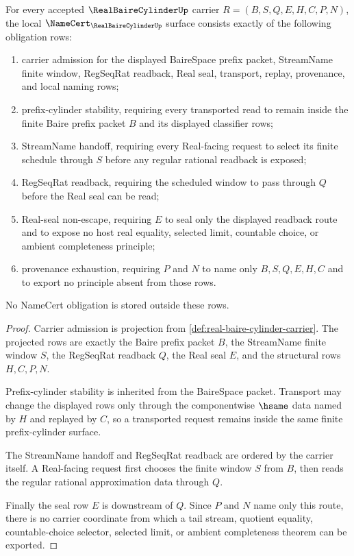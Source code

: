 \begin{theorem}\label{thm:real-baire-cylinder-namecert-obligations}
For every accepted $\RealBaireCylinderUp$ carrier $R=(B,S,Q,E,H,C,P,N)$, the local $\NameCert_{\RealBaireCylinderUp}$ surface consists exactly of the following obligation rows:
\begin{enumerate}
\item carrier admission for the displayed BaireSpace prefix packet, StreamName finite window, RegSeqRat readback, Real seal, transport, replay, provenance, and local naming rows;
\item prefix-cylinder stability, requiring every transported read to remain inside the finite Baire prefix packet $B$ and its displayed classifier rows;
\item StreamName handoff, requiring every Real-facing request to select its finite schedule through $S$ before any regular rational readback is exposed;
\item RegSeqRat readback, requiring the scheduled window to pass through $Q$ before the Real seal can be read;
\item Real-seal non-escape, requiring $E$ to seal only the displayed readback route and to expose no host real equality, selected limit, countable choice, or ambient completeness principle;
\item provenance exhaustion, requiring $P$ and $N$ to name only $B,S,Q,E,H,C$ and to export no principle absent from those rows.
\end{enumerate}
No NameCert obligation is stored outside these rows.
\end{theorem}
\begin{proof}
Carrier admission is projection from \autoref{def:real-baire-cylinder-carrier}. The projected rows are exactly the Baire prefix packet $B$, the StreamName finite window $S$, the RegSeqRat readback $Q$, the Real seal $E$, and the structural rows $H,C,P,N$.

Prefix-cylinder stability is inherited from the BaireSpace packet. Transport may change the displayed rows only through the componentwise $\hsame$ data named by $H$ and replayed by $C$, so a transported request remains inside the same finite prefix-cylinder surface.

The StreamName handoff and RegSeqRat readback are ordered by the carrier itself. A Real-facing request first chooses the finite window $S$ from $B$, then reads the regular rational approximation data through $Q$.

Finally the seal row $E$ is downstream of $Q$. Since $P$ and $N$ name only this route, there is no carrier coordinate from which a tail stream, quotient equality, countable-choice selector, selected limit, or ambient completeness theorem can be exported.
\end{proof}

